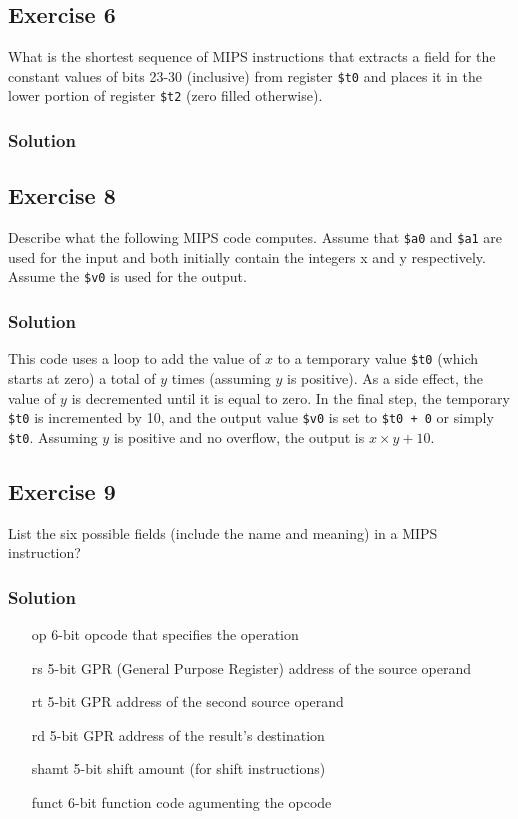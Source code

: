 \documentclass[12pt]{article}
\begin{document}
\subsection*{Exercise 6}
What is the shortest sequence of MIPS instructions that extracts a field for the constant values of bits 23-30 (inclusive) from register {\tt\$t0} and places it in the lower portion of register {\tt\$t2} (zero filled otherwise).
\subsubsection*{Solution}


\subsection*{Exercise 8}
Describe what the following MIPS code computes. Assume that {\tt \$a0} and {\tt \$a1} are used for the input and both initially contain the integers x and y respectively. Assume the {\tt\$v0} is used for the output.

\subsubsection*{Solution}
This code uses a loop to add the value of $x$ to a temporary value {\tt\$t0} (which starts at zero) a total of $y$ times (assuming $y$ is positive). As a side effect, the value of $y$ is decremented until it is equal to zero. In the final step, the temporary {\tt \$t0} is incremented by 10, and the output value {\tt \$v0} is set to {\tt \$t0 + 0} or simply {\tt\$t0}. Assuming $y$ is positive and no overflow, the output is $x \times y + 10$.

\subsection*{Exercise 9}
List the six possible fields (include the name and meaning) in a MIPS instruction?
\subsubsection*{Solution}
\begin{itemize}
\item[op] 6-bit opcode that specifies the operation
\item[rs] 5-bit GPR (General Purpose Register) address of the source operand
\item[rt] 5-bit GPR address of the second source operand
\item[rd] 5-bit GPR address of the result's destination
\item[shamt] 5-bit shift amount (for shift instructions)
\item[funct] 6-bit function code agumenting the opcode
\end{itemize}
\end{document}
